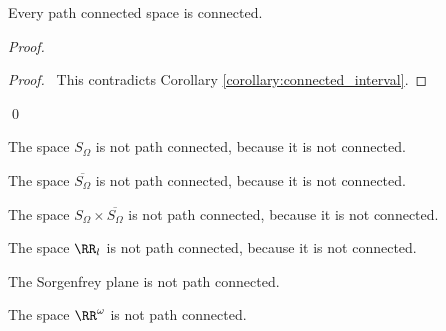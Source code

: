 \begin{proposition}
    \label{proposition:connected_path_connected}
    Every path connected space is connected.
\end{proposition}

\begin{proof}
    \pf
    \qedstep
    \begin{proof}
        \pf\ This contradicts Corollary \ref{corollary:connected_interval}.
    \end{proof}
    \qed
\end{proof}

\begin{example}
    The space $S_\Omega$ is not path connected, because it is not connected.
\end{example}

\begin{example}
    The space $\overline{S_\Omega}$ is not path connected, because it is not connected.
\end{example}

\begin{example}
    The space $S_\Omega \times \overline{S_\Omega}$ is not path connected, because it is not connected.
\end{example}

\begin{example}
    The space $\RR_l$ is not path connected, because it is not connected.
\end{example}

\begin{corollary}
    The Sorgenfrey plane is not path connected.
\end{corollary}

\begin{corollary}
    The space $\RR^\omega$ is not path connected.
\end{corollary}

